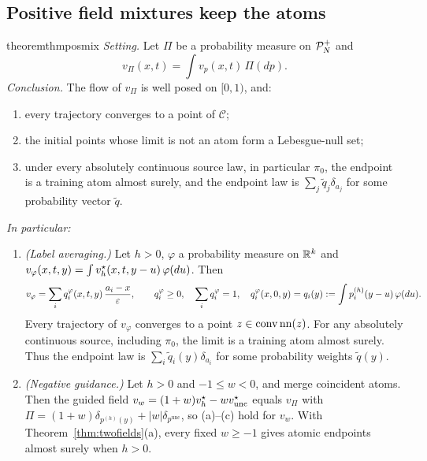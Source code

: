 \documentclass{article} %
\theoremstyle{plain}
\theoremstyle{definition}
\theoremstyle{remark}
\begin{document}
\subsection{Positive field mixtures keep the atoms}
\label{sec:posmix}

\begin{restatable}{theorem}{thmposmix}
\label{thm:posmix}
\emph{Setting.} Let $\Pi$ be a probability measure on $\mathcal{P}_N^{+}$ and
\begin{equation}
v_\Pi(x,t)=\int v_p(x,t)\,\Pi(dp).
\label{eq:mixture}
\end{equation}
\emph{Conclusion.} The flow of $v_\Pi$ is well posed on $[0,1)$, and:
\begin{enumerate}[label=(\alph*),leftmargin=2em]
\item every trajectory converges to a point of $\mathcal C$;
\item the initial points whose limit is not an atom form a Lebesgue-null set;
\item under every absolutely continuous source law, in particular $\pi_0$, the endpoint is a
  training atom almost surely, and the endpoint law is $\sum_j\tilde q_j\delta_{a_j}$ for
  some probability vector $\tilde q$.
\end{enumerate}
\emph{In particular:}
\begin{enumerate}[label=(\alph*),leftmargin=2em,resume]
\item \emph{(Label averaging.)} Let $h>0$, $\varphi$ a probability measure on $\mathbb{R}^k$ and
  $v_\varphi(x,t,y)=\int v_h^\star(x,t,y-u)\,\varphi(du)$. Then
  \begin{equation}
  v_\varphi=\sum_iq^\varphi_i(x,t,y)\,\frac{a_i-x}{\varepsilon},\qquad
  q^\varphi_i\ge0,\quad \sum_iq^\varphi_i=1,\quad
  q^\varphi_i(x,0,y)=q_i(y):=\int p_i^{(h)}(y-u)\,\varphi(du).
  \label{eq:label-average}
  \end{equation}
  Every trajectory of $v_\varphi$ converges to a point $z\in\operatorname{conv}\operatorname{nn}(z)$. For any
  absolutely continuous source, including $\pi_0$, the limit is a training atom almost surely.
  Thus the endpoint law is $\sum_i\tilde q_i(y)\delta_{a_i}$ for some probability weights
  $\tilde q(y)$.
\item \emph{(Negative guidance.)} Let $h>0$ and $-1\le w<0$, and merge coincident atoms. Then the
  guided field $v_w=(1+w)v_h^\star-wv_{\mathrm{unc}}^\star$ equals $v_\Pi$ with
  $\Pi=(1+w)\delta_{p^{(h)}(y)}+|w|\delta_{p^{\mathrm{unc}}}$, so (a)--(c) hold for $v_w$. With
  Theorem~\ref{thm:twofields}(a), every fixed $w\ge-1$ gives atomic endpoints almost surely when
  $h>0$.
\end{enumerate}
\end{restatable}
\end{document}
